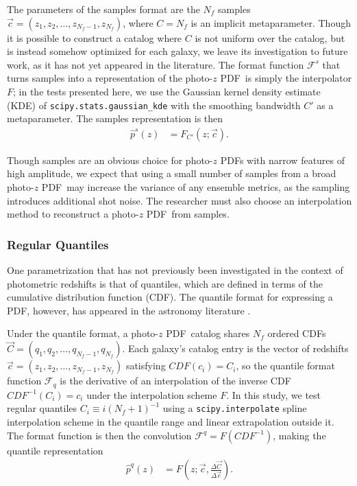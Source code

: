 \documentclass[\docopts]{\docclass}
\newcommand{\pz}{photo-$z$ PDF}
\begin{document}
The parameters of the samples format are the $N_{f}$ samples $\vec{c}=(z_{1}, 
z_{2}, \dots, z_{N_{f}-1}, z_{N_{f}})$, where $C=N_{f}$ is an implicit 
metaparameter.
Though it is possible to construct a catalog where $C$ is not uniform over the 
catalog, but is instead somehow optimized for each galaxy, we leave its 
investigation to future work, as it has not yet appeared in the literature.
The format function $\mathcal{F}^{s}$ that turns samples into a representation 
of the \pz\ is simply the interpolator $F$; in the tests presented here, we use 
the Gaussian kernel density estimate (KDE) of 
\texttt{scipy.stats.gaussian\_kde} with the smoothing bandwidth $C'$ as a 
metaparameter.  The samples representation is then
\begin{align}
  \label{eq:sampled}
  \hat{p}^{s}(z) &= F_{C'}(z; \vec{c}).
\end{align}

Though samples are an obvious choice for \pz s with narrow features of high 
amplitude, we expect that using a small number of samples from a broad \pz\ may 
increase the variance of any ensemble metrics, as the sampling introduces 
additional shot noise.
The researcher must also choose an interpolation method to reconstruct a \pz\ 
from samples.

\subsubsection{Regular Quantiles}
\label{sec:quantiles}

One parametrization that has not previously been investigated in the context of 
photometric redshifts is that of quantiles, which are defined in terms of the 
cumulative distribution function (CDF).
The quantile format for expressing a PDF, however, has appeared in the 
astronomy literature \citep{sun_star_2015, pizzocaro_results_2016, 
laycock_x-ray_2017}.

Under the quantile format, a \pz\ catalog shares $N_{f}$ ordered CDFs 
$\vec{C}=(q_{1}, q_{2}, \dots, q_{N_{f}-1}, q_{N_{f}})$.
Each galaxy's catalog entry is the vector of redshifts $\vec{c}=(z_{1}, z_{2}, 
\dots, z_{N_{f}-1}, z_{N_{f}})$ satisfying $CDF(c_{i})=C_{i}$, so the quantile 
format function $\mathcal{F}_{q}$ is the derivative of an interpolation of the 
inverse CDF $CDF^{-1}(C_{i})=c_{i}$ under the interpolation scheme $F$.
In this study, we test regular quantiles $C_{i}\equiv i(N_{f}+1)^{-1}$ using a 
\texttt{scipy.interpolate} spline interpolation scheme in the quantile range 
and linear extrapolation outside it.
The format function is then the convolution $\mathcal{F}^{q}=F(CDF^{-1})$, 
making the quantile representation
\begin{align}
  \label{eq:quantiles}
  \hat{p}^{q}(z) &= F\left(z; \vec{c}, 
\frac{\Delta\vec{C}}{\Delta\vec{c}}\right).
\end{align}
\end{document}
